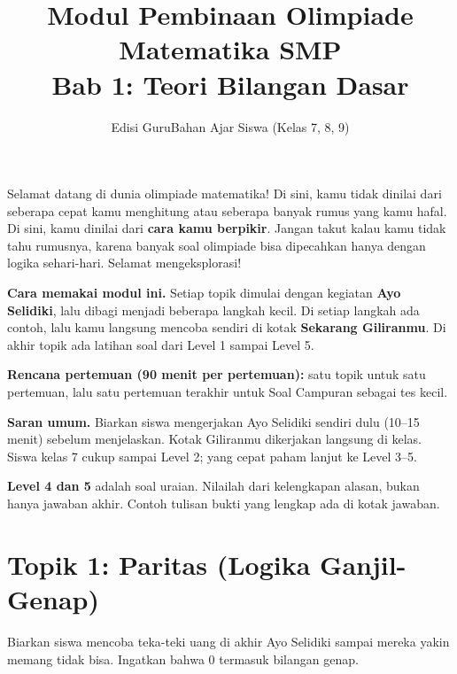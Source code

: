 \documentclass[11pt,a4paper]{article}
\title{\textbf{Modul Pembinaan Olimpiade Matematika SMP\\Bab 1: Teori Bilangan Dasar}}
\author{\ifguru Edisi Guru\else Bahan Ajar Siswa (Kelas 7, 8, 9)\fi}
\date{}
\begin{document}
\maketitle
\thispagestyle{empty}

\begin{tcolorbox}[title={Halo Calon Sang Juara!}]
Selamat datang di dunia olimpiade matematika! Di sini, kamu tidak dinilai dari seberapa cepat
kamu menghitung atau seberapa banyak rumus yang kamu hafal. Di sini, kamu dinilai dari
\textbf{cara kamu berpikir}. Jangan takut kalau kamu tidak tahu rumusnya, karena banyak soal
olimpiade bisa dipecahkan hanya dengan logika sehari-hari. Selamat mengeksplorasi!
\end{tcolorbox}

\textbf{Cara memakai modul ini.} Setiap topik dimulai dengan kegiatan \textbf{Ayo Selidiki},
lalu dibagi menjadi beberapa langkah kecil. Di setiap langkah ada contoh, lalu kamu langsung
mencoba sendiri di kotak \textbf{Sekarang Giliranmu}. Di akhir topik ada latihan soal dari
Level 1 sampai Level 5.

\ifguru
\begin{catatanguru}
\textbf{Rencana pertemuan (90 menit per pertemuan):} satu topik untuk satu pertemuan, lalu
satu pertemuan terakhir untuk Soal Campuran sebagai tes kecil.

\textbf{Saran umum.} Biarkan siswa mengerjakan Ayo Selidiki sendiri dulu (10--15 menit) sebelum
menjelaskan. Kotak Giliranmu dikerjakan langsung di kelas. Siswa kelas 7 cukup sampai Level 2;
yang cepat paham lanjut ke Level 3--5.

\textbf{Level 4 dan 5} adalah soal uraian. Nilailah dari kelengkapan alasan, bukan hanya
jawaban akhir. Contoh tulisan bukti yang lengkap ada di kotak jawaban.
\end{catatanguru}
\fi

\newpage
\section*{Topik 1: Paritas (Logika Ganjil-Genap)}

\begin{catatanguru}
Biarkan siswa mencoba teka-teki uang di akhir Ayo Selidiki sampai mereka yakin memang tidak bisa.
Ingatkan bahwa 0 termasuk bilangan genap.
\end{catatanguru}
\end{document}
